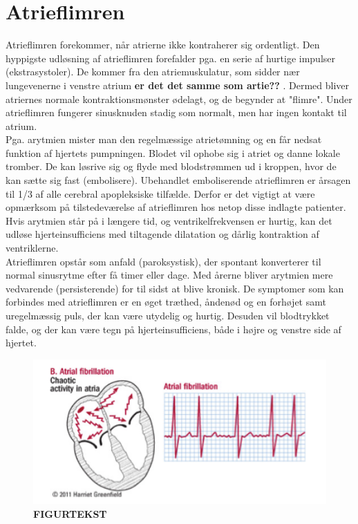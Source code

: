 \section{Atrieflimren}
Atrieflimren forekommer, når atrierne ikke kontraherer sig ordentligt. Den hyppigste udløsning af atrieflimren forefalder pga. en serie af hurtige impulser (ekstrasystoler).  De kommer fra den atriemuskulatur, som sidder nær lungevenerne i venstre atrium \textbf{er det det samme som artie??} . Dermed bliver atriernes normale kontraktionsmønster ødelagt, og de begynder at "flimre". Under atrieflimren fungerer sinusknuden stadig som normalt, men har ingen kontakt til atrium.\\
Pga. arytmien mister man den regelmæssige atrietømning og en får nedsat funktion af hjertets pumpningen. Blodet vil ophobe sig i atriet og danne lokale tromber.  De kan løsrive sig og flyde med blodstrømmen ud i kroppen, hvor de kan sætte sig fast (embolisere). Ubehandlet emboliserende atrieflimren er årsagen til 1/3 af alle cerebral apopleksiske tilfælde. Derfor er det vigtigt at være opmærksom på tilstedeværelse af atrieflimren hos netop disse indlagte patienter.\\
Hvis arytmien står på i længere tid, og ventrikelfrekvensen er hurtig, kan det udløse hjerteinsufficiens med tiltagende dilatation og dårlig kontraktion af ventriklerne. \\
Atrieflimren opstår som anfald (paroksystisk), der spontant konverterer til normal sinusrytme efter få timer eller dage. Med årerne bliver arytmien mere vedvarende (persisterende) for til sidst at blive kronisk.  De symptomer som kan forbindes med atrieflimren er en øget træthed, åndenød og en forhøjet samt uregelmæssig puls, der kan være utydelig og hurtig. Desuden vil blodtrykket falde, og der kan være tegn på hjerteinsufficiens, både i højre og venstre side af hjertet. 

\begin{figure}[htb]
	\centering
	\includegraphics[width=1\textwidth]{Figurer/Snip20150412_32}
	\caption{\textbf{FIGURTEKST}\protect\footnotemark}
\end{figure}

